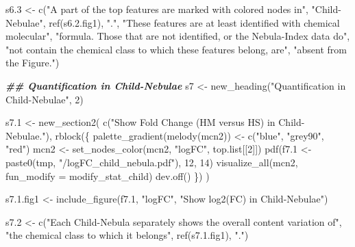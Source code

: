 \documentclass[
]{article}
\newenvironment{Shaded}{\begin{snugshade}}{\end{snugshade}}
\newcommand{\AttributeTok}[1]{\textcolor[rgb]{0.77,0.63,0.00}{#1}}
\newcommand{\DecValTok}[1]{\textcolor[rgb]{0.00,0.00,0.81}{#1}}
\newcommand{\DocumentationTok}[1]{\textcolor[rgb]{0.56,0.35,0.01}{\textbf{\textit{#1}}}}
\newcommand{\FloatTok}[1]{\textcolor[rgb]{0.00,0.00,0.81}{#1}}
\newcommand{\FunctionTok}[1]{\textcolor[rgb]{0.00,0.00,0.00}{#1}}
\newcommand{\NormalTok}[1]{#1}
\newcommand{\OtherTok}[1]{\textcolor[rgb]{0.56,0.35,0.01}{#1}}
\newcommand{\StringTok}[1]{\textcolor[rgb]{0.31,0.60,0.02}{#1}}
\begin{document}
\begin{Shaded}
\begin{Highlighting}[]
\NormalTok{s6}\FloatTok{.3} \OtherTok{\textless{}{-}} \FunctionTok{c}\NormalTok{(}\StringTok{"A part of the top features are marked with colored nodes in"}\NormalTok{,}
          \StringTok{"Child{-}Nebulae"}\NormalTok{, }\FunctionTok{ref}\NormalTok{(s6.}\FloatTok{2.}\NormalTok{fig1), }\StringTok{"."}\NormalTok{,}
          \StringTok{"These features are at least identified with chemical molecular"}\NormalTok{,}
          \StringTok{"formula. Those that are not identified, or the Nebula{-}Index data do"}\NormalTok{,}
          \StringTok{"not contain the chemical class to which these features belong, are"}\NormalTok{,}
          \StringTok{"absent from the Figure."}\NormalTok{)}

\DocumentationTok{\#\# Quantification in Child{-}Nebulae}
\NormalTok{s7 }\OtherTok{\textless{}{-}} \FunctionTok{new\_heading}\NormalTok{(}\StringTok{"Quantification in Child{-}Nebulae"}\NormalTok{, }\DecValTok{2}\NormalTok{)}

\NormalTok{s7}\FloatTok{.1} \OtherTok{\textless{}{-}} \FunctionTok{new\_section2}\NormalTok{(}
  \FunctionTok{c}\NormalTok{(}\StringTok{"Show Fold Change (HM versus HS) in Child{-}Nebulae."}\NormalTok{),}
  \FunctionTok{rblock}\NormalTok{(\{}
    \FunctionTok{palette\_gradient}\NormalTok{(}\FunctionTok{melody}\NormalTok{(mcn2)) }\OtherTok{\textless{}{-}} \FunctionTok{c}\NormalTok{(}\StringTok{"blue"}\NormalTok{, }\StringTok{"grey90"}\NormalTok{, }\StringTok{"red"}\NormalTok{)}
\NormalTok{    mcn2 }\OtherTok{\textless{}{-}} \FunctionTok{set\_nodes\_color}\NormalTok{(mcn2, }\StringTok{"logFC"}\NormalTok{, top.list[[}\DecValTok{2}\NormalTok{]])}
    \FunctionTok{pdf}\NormalTok{(f7}\FloatTok{.1} \OtherTok{\textless{}{-}} \FunctionTok{paste0}\NormalTok{(tmp, }\StringTok{"/logFC\_child\_nebula.pdf"}\NormalTok{), }\DecValTok{12}\NormalTok{, }\DecValTok{14}\NormalTok{)}
    \FunctionTok{visualize\_all}\NormalTok{(mcn2, }\AttributeTok{fun\_modify =}\NormalTok{ modify\_stat\_child)}
    \FunctionTok{dev.off}\NormalTok{()}
\NormalTok{  \})}
\NormalTok{)}

\NormalTok{s7.}\FloatTok{1.}\NormalTok{fig1 }\OtherTok{\textless{}{-}} \FunctionTok{include\_figure}\NormalTok{(f7}\FloatTok{.1}\NormalTok{, }\StringTok{"logFC"}\NormalTok{, }\StringTok{"Show log2(FC) in Child{-}Nebulae"}\NormalTok{)}

\NormalTok{s7}\FloatTok{.2} \OtherTok{\textless{}{-}} \FunctionTok{c}\NormalTok{(}\StringTok{"Each Child{-}Nebula separately shows the overall content variation of"}\NormalTok{,}
          \StringTok{"the chemical class to which it belongs"}\NormalTok{, }\FunctionTok{ref}\NormalTok{(s7.}\FloatTok{1.}\NormalTok{fig1), }\StringTok{"."}\NormalTok{)}


\end{Highlighting}
\end{Shaded}
\end{document}

